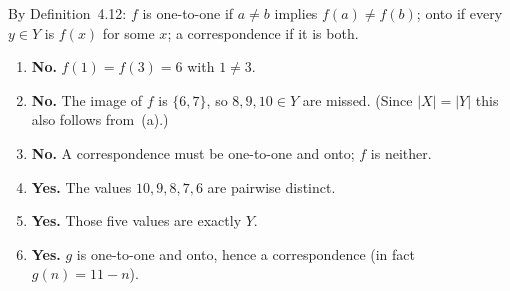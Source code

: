 \begin{soln}
By Definition~4.12: $f$ is one-to-one if $a\ne b$ implies $f(a)\ne f(b)$; onto if every $y\in Y$ is $f(x)$ for some $x$; a correspondence if it is both.
\begin{enumerate}[label=\alph*.]
\item \textbf{No.} $f(1)=f(3)=6$ with $1\ne 3$.
\item \textbf{No.} The image of $f$ is $\{6,7\}$, so $8,9,10\in Y$ are missed. (Since $|X|=|Y|$ this also follows from~(a).)
\item \textbf{No.} A correspondence must be one-to-one and onto; $f$ is neither.
\item \textbf{Yes.} The values $10,9,8,7,6$ are pairwise distinct.
\item \textbf{Yes.} Those five values are exactly $Y$.
\item \textbf{Yes.} $g$ is one-to-one and onto, hence a correspondence (in fact $g(n)=11-n$).
\end{enumerate}
\end{soln}

